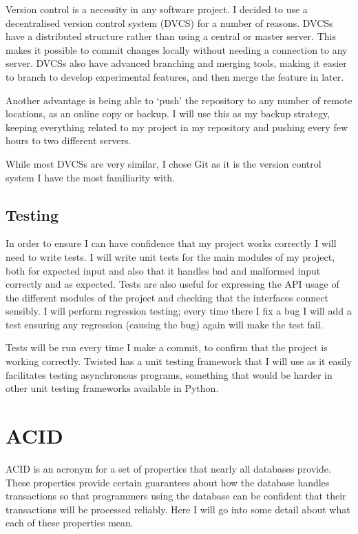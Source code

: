 \documentclass[12pt,twoside,notitlepage]{report}
\begin{document}
Version control is a necessity in any software project. I decided to use a decentralised version
control system (DVCS) for a number of reasons. DVCSs have a distributed structure rather than
using a central or master server. This makes it possible to commit changes locally without needing
a connection to any server. DVCSs also have advanced branching and merging tools, making it easier
to branch to develop experimental features, and then merge the feature in later.

Another advantage is being able to `push' the repository to any number of remote locations, as
an online copy or backup. I will use this as my backup strategy, keeping everything related to
my project in my repository and pushing every few hours to two different servers.

While most DVCSs are very similar, I chose Git as it is the version control system I have the most
familiarity with.

\subsection{Testing}

In order to ensure I can have confidence that my project works correctly I will need to write
tests. I will write unit tests for the main modules of my project, both for expected input and
also that it handles bad and malformed input correctly and as expected. Tests are also useful for
expressing the API usage of the different modules of the project and checking that the interfaces
connect sensibly. I will perform regression testing; every time there I fix a bug I will
add a test ensuring any regression (causing the bug) again will make the test fail.

Tests will be run every time I make a commit, to confirm that the project
is working correctly. Twisted has a unit testing framework that I will use as it easily
facilitates testing asynchronous programs, something that would be harder in other unit testing
frameworks available in Python.

\section{ACID}

ACID is an acronym for a set of properties that nearly all databases provide. These properties
provide certain guarantees about how the database handles transactions so that programmers using
the database can be confident that their transactions will be processed reliably. Here I will go
into some detail about what each of these properties mean.
\end{document}
